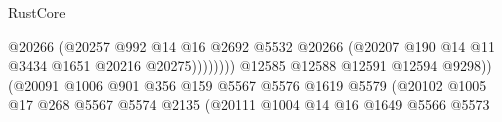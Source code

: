\begin{lexlean}{RustCore}
\begin{coremodule}
                                                            @20266
                                                            (@20257
                                                              @992
                                                              @14
                                                              @16
                                                              @2692
                                                              @5532
                                                              @20266
                                                              (@20207
                                                                @190
                                                                @14
                                                                @11
                                                                @3434
                                                                @1651
                                                                @20216
                                                                @20275))))))))
                                                @12585
                                                @12588
                                                @12591
                                                @12594
                                                @9298))
                                            (@20091
                                              @1006
                                              @901
                                              @356
                                              @159
                                              @5567
                                              @5576
                                              @1619
                                              @5579
                                              (@20102
                                                @1005
                                                @17
                                                @268
                                                @5567
                                                @5574
                                                @2135
                                                (@20111
                                                  @1004
                                                  @14
                                                  @16
                                                  @1649
                                                  @5566
                                                  @5573

\end{coremodule}
\end{lexlean}
